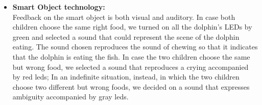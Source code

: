 \documentclass [12pt]{article}
\begin{document}
\begin{itemize}[•]
\begin{figure}[h!]
\hspace*{\fill}
\end{figure}
\clearpage
\item \textbf{Smart Object technology:}\\
Feedback on the smart object is both visual and auditory. In case both children choose the same right food, we turned on all the dolphin's LEDs by green and selected a sound that could represent the scene of the dolphin eating. The sound chosen reproduces the sound of chewing so that it indicates that the dolphin is eating the fish.   In case the two children choose the same but wrong food, we selected a sound that reproduces a crying accompanied by red leds; In an indefinite situation, instead, in which the two children choose two different but wrong foods, we decided on a sound that expresses ambiguity accompanied by gray leds.
\end{itemize}
\end{document}
